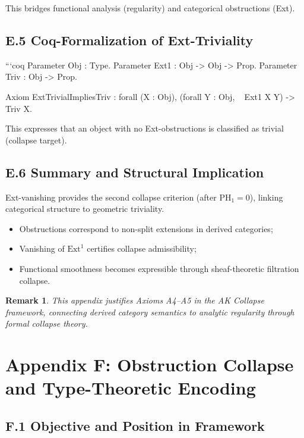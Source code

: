 \documentclass[11pt]{article}
\newtheorem{remark}[theorem]{Remark}
\begin{document}
This bridges functional analysis (regularity) and categorical obstructions (Ext).

\subsection*{E.5 Coq-Formalization of Ext-Triviality}

```coq
Parameter Obj : Type.
Parameter Ext1 : Obj -> Obj -> Prop.
Parameter Triv : Obj -> Prop.

Axiom ExtTrivialImpliesTriv :
  forall (X : Obj),
    (forall Y : Obj, ~ Ext1 X Y) -> Triv X.

This expresses that an object with no Ext-obstructions is classified as trivial (collapse target).

\subsection*{E.6 Summary and Structural Implication}

Ext-vanishing provides the second collapse criterion (after \( \mathrm{PH}_1 = 0 \)),  
linking categorical structure to geometric triviality.

\begin{itemize}
  \item Obstructions correspond to non-split extensions in derived categories;
  \item Vanishing of \( \mathrm{Ext}^1 \) certifies collapse admissibility;
  \item Functional smoothness becomes expressible through sheaf-theoretic filtration collapse.
\end{itemize}

\begin{remark}
This appendix justifies Axioms A4–A5 in the AK Collapse framework,  
connecting derived category semantics to analytic regularity through formal collapse theory.
\end{remark}



\section*{Appendix F: Obstruction Collapse and Type-Theoretic Encoding}

\subsection*{F.1 Objective and Position in Framework}
\end{document}
